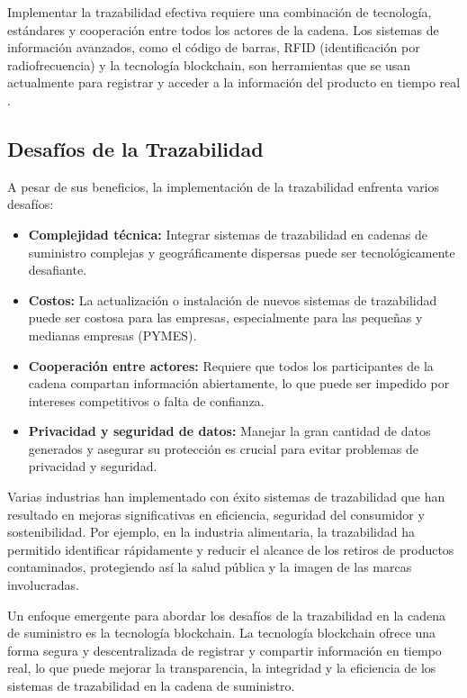 \documentclass[main.tex]{subfiles}
\begin{document}
Implementar la trazabilidad efectiva requiere una combinación de tecnología, estándares y cooperación entre todos los actores de la cadena. Los sistemas de información avanzados, como el código de barras, RFID (identificación por radiofrecuencia) y la tecnología blockchain, son herramientas que se usan actualmente para registrar y acceder a la información del producto en tiempo real \cite{cepeda2010trazabilidad, BISWAS2023128}.

\subsection{Desafíos de la Trazabilidad}
A pesar de sus beneficios, la implementación de la trazabilidad enfrenta varios desafíos:
\begin{itemize}
    \item \textbf{Complejidad técnica:} Integrar sistemas de trazabilidad en cadenas de suministro complejas y geográficamente dispersas puede ser tecnológicamente desafiante.
    \item \textbf{Costos:} La actualización o instalación de nuevos sistemas de trazabilidad puede ser costosa para las empresas, especialmente para las pequeñas y medianas empresas (PYMES).
    \item \textbf{Cooperación entre actores:} Requiere que todos los participantes de la cadena compartan información abiertamente, lo que puede ser impedido por intereses competitivos o falta de confianza.
    \item \textbf{Privacidad y seguridad de datos:} Manejar la gran cantidad de datos generados y asegurar su protección es crucial para evitar problemas de privacidad y seguridad.
\end{itemize}

Varias industrias han implementado con éxito sistemas de trazabilidad que han resultado en mejoras significativas en eficiencia, seguridad del consumidor y sostenibilidad. Por ejemplo, en la industria alimentaria, la trazabilidad ha permitido identificar rápidamente y reducir el alcance de los retiros de productos contaminados, protegiendo así la salud pública y la imagen de las marcas involucradas.

Un enfoque emergente para abordar los desafíos de la trazabilidad en la cadena de suministro es la tecnología blockchain. La tecnología blockchain ofrece una forma segura y descentralizada de registrar y compartir información en tiempo real, lo que puede mejorar la transparencia, la integridad y la eficiencia de los sistemas de trazabilidad en la cadena de suministro.


\end{document}
